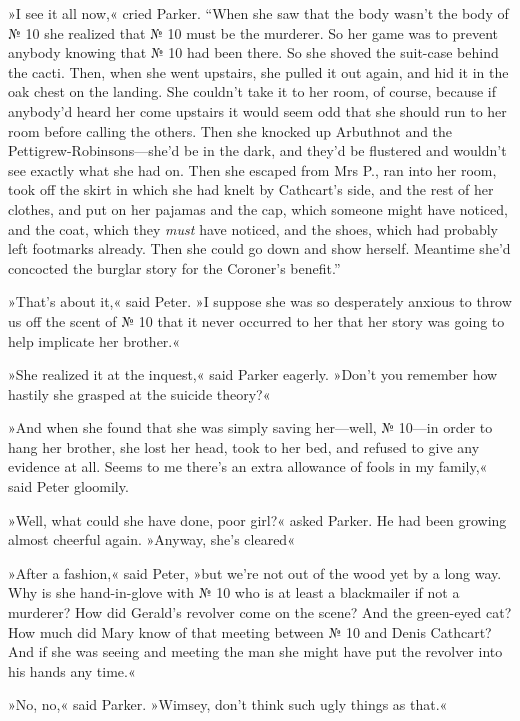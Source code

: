»I see it all now,« cried Parker. \enquote{When she saw that the body wasn't the body of № 10 she realized that № 10 must be the murderer. So her game was to prevent anybody knowing that № 10 had been there.  So she shoved the suit-case behind the cacti. Then, when she went upstairs, she pulled it out again, and hid it in the oak chest on the landing. She couldn't take it to her room, of course, because if anybody'd heard her come upstairs it would seem odd that she should run to her room before calling the others. Then she knocked up Arbuthnot and the Pettigrew-Robinsons\allowbreak---\allowbreak she'd be in the dark, and they'd be flustered and wouldn't see exactly what she had on. Then she escaped from Mrs P., ran into her room, took off the skirt in which she had knelt by Cathcart's side, and the rest of her clothes, and put on her pajamas and the cap, which someone might have noticed, and the coat, which they \textit{must} have noticed, and the shoes, which had probably left footmarks already. Then she could go down and show herself. Meantime she'd concocted the burglar story for the Coroner's benefit.}

»That's about it,« said Peter. »I suppose she was so desperately anxious to throw us off the scent of № 10 that it never occurred to her that her story was going to help implicate her brother.«

»She realized it at the inquest,« said Parker eagerly. »Don't you remember how hastily she grasped at the suicide theory?«

»And when she found that she was simply saving her\allowbreak---\allowbreak well, № 10\allowbreak---\allowbreak in order to hang her brother, she lost her head, took to her bed, and refused to give any evidence at all. Seems to me there's an extra allowance of fools in my family,« said Peter gloomily.

»Well, what could she have done, poor girl?« asked Parker. He had been growing almost cheerful again. »Anyway, she's cleared\longdash«

»After a fashion,« said Peter, »but we're not out of the wood yet by a long way. Why is she hand-in-glove with № 10 who is at least a blackmailer if not a murderer? How did Gerald's revolver come on the scene? And the green-eyed cat? How much did Mary know of that meeting between № 10 and Denis Cathcart? And if she was seeing and meeting the man she might have put the revolver into his hands any time.«

»No, no,« said Parker. »Wimsey, don't think such ugly things as that.«

